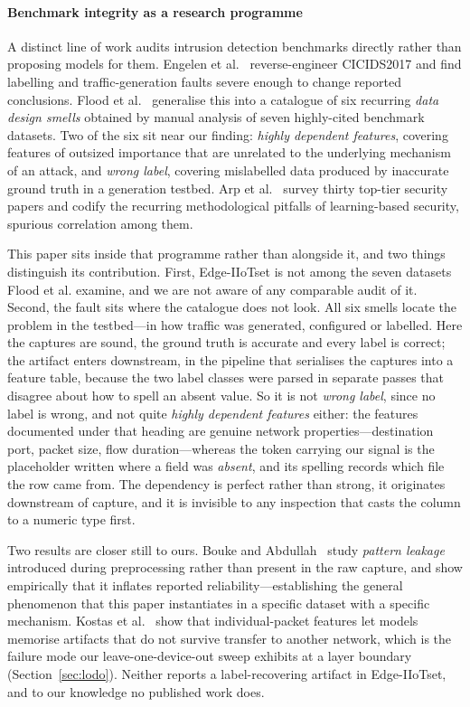 \paragraph{Benchmark integrity as a research programme} A distinct line of work
audits intrusion detection benchmarks directly rather than proposing models for
them. Engelen et al.~\cite{engelen2021cicids} reverse-engineer CICIDS2017 and
find labelling and traffic-generation faults severe enough to change reported
conclusions. Flood et al.~\cite{flood2024designsmells} generalise this into a
catalogue of six recurring \emph{data design smells} obtained by manual
analysis of seven highly-cited benchmark datasets. Two of the six sit near our
finding: \emph{highly dependent features}, covering features of outsized
importance that are unrelated to the underlying mechanism of an attack, and
\emph{wrong label}, covering mislabelled data produced by inaccurate ground
truth in a generation testbed. Arp et al.~\cite{arp2022dosdonts} survey thirty top-tier
security papers and codify the recurring methodological pitfalls of
learning-based security, spurious correlation among them.

This paper sits inside that programme rather than alongside it, and two things
distinguish its contribution. First, Edge-IIoTset is not among the seven
datasets Flood et al. examine, and we are not aware of any comparable audit of
it. Second, the fault sits where the catalogue does not look. All six smells
locate the problem in the testbed---in how traffic was generated, configured or
labelled. Here the captures are sound, the ground truth is accurate and every
label is correct; the artifact enters downstream, in the pipeline that
serialises the captures into a feature table, because the two label classes
were parsed in separate passes that disagree about how to spell an absent
value. So it is not \emph{wrong label}, since no label is wrong, and not quite
\emph{highly dependent features} either: the features documented under that
heading are genuine network properties---destination port, packet size, flow
duration---whereas the token carrying our signal is the placeholder written
where a field was \emph{absent}, and its spelling records which file the row
came from. The dependency is perfect rather than strong, it originates
downstream of capture, and it is invisible to any inspection that casts the
column to a numeric type first.

Two results are closer still to ours. Bouke and
Abdullah~\cite{bouke2023patternleakage} study \emph{pattern leakage} introduced
during preprocessing rather than present in the raw capture, and show
empirically that it inflates reported reliability---establishing the general
phenomenon that this paper instantiates in a specific dataset with a specific
mechanism. Kostas et al.~\cite{kostas2024packetfeatures} show that
individual-packet features let models memorise artifacts that do not survive
transfer to another network, which is the failure mode our leave-one-device-out
sweep exhibits at a layer boundary (Section~\ref{sec:lodo}). Neither reports a
label-recovering artifact in Edge-IIoTset, and to our knowledge no published
work does.

